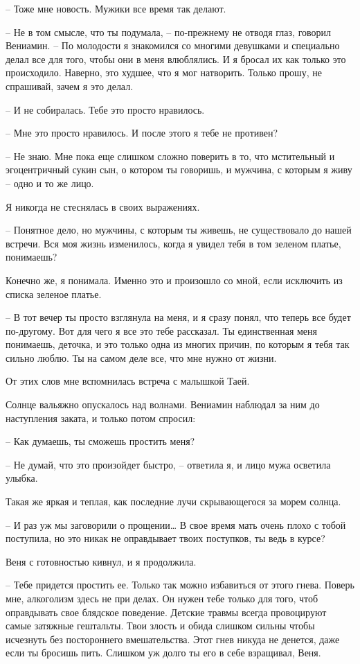 \documentclass[
]{book}
\begin{document}
-- Тоже мне новость. Мужики все время так делают.

-- Не в том смысле, что ты подумала, -- по-прежнему не отводя глаз, говорил Вениамин. -- По молодости я знакомился со многими девушками и специально делал все для того, чтобы они в меня влюблялись. И я бросал их как только это происходило. Наверно, это худшее, что я мог натворить. Только прошу, не спрашивай, зачем я это делал.

-- И не собиралась. Тебе это просто нравилось.

-- Мне это просто нравилось. И после этого я тебе не противен?

-- Не знаю. Мне пока еще слишком сложно поверить в то, что мстительный и эгоцентричный сукин сын, о котором ты говоришь, и мужчина, с которым я живу -- одно и то же лицо.

Я никогда не стеснялась в своих выражениях.

-- Понятное дело, но мужчины, с которым ты живешь, не существовало до нашей встречи. Вся моя жизнь изменилось, когда я увидел тебя в том зеленом платье, понимаешь?

Конечно же, я понимала. Именно это и произошло со мной, если исключить из списка зеленое платье.

-- В тот вечер ты просто взглянула на меня, и я сразу понял, что теперь все будет по-другому. Вот для чего я все это тебе рассказал. Ты единственная меня понимаешь, деточка, и это только одна из многих причин, по которым я тебя так сильно люблю. Ты на самом деле все, что мне нужно от жизни.

От этих слов мне вспомнилась встреча с малышкой Таей.

Солнце вальяжно опускалось над волнами. Вениамин наблюдал за ним до наступления заката, и только потом спросил:

-- Как думаешь, ты сможешь простить меня?

-- Не думай, что это произойдет быстро, -- ответила я, и лицо мужа осветила улыбка.

Такая же яркая и теплая, как последние лучи скрывающегося за морем солнца.

-- И раз уж мы заговорили о прощении\ldots{} В свое время мать очень плохо с тобой поступила, но это никак не оправдывает твоих поступков, ты ведь в курсе?

Веня с готовностью кивнул, и я продолжила.

-- Тебе придется простить ее. Только так можно избавиться от этого гнева. Поверь мне, алкоголизм здесь не при делах. Он нужен тебе только для того, чтоб оправдывать свое блядское поведение. Детские травмы всегда провоцируют самые затяжные гештальты. Твои злость и обида слишком сильны чтобы исчезнуть без постороннего вмешательства. Этот гнев никуда не денется, даже если ты бросишь пить. Слишком уж долго ты его в себе взращивал, Веня.
\end{document}

